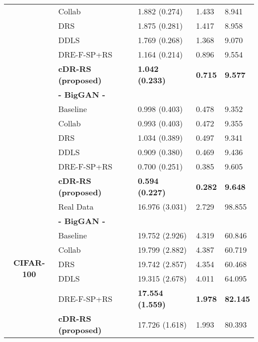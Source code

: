 \documentclass[final,12pt, 3p,times]{elsarticle}
\begin{document}
\begin{table}[htbp]
\begin{adjustbox}{width=0.5\textwidth}
\begin{tabular}{rllll}
			\multicolumn{1}{c}{} & Collab \cite{liu2020collaborative} & 1.882 (0.274) & 1.433 & 8.941 \\
			\multicolumn{1}{c}{} & DRS \cite{azadi2018discriminator}  & 1.875 (0.281) & 1.417 & 8.958\\
			\multicolumn{1}{c}{} & DDLS \cite{che2020your}  & 1.769 (0.268) & 1.368 & 9.070 \\
			\multicolumn{1}{c}{} & DRE-F-SP+RS \cite{ding2020subsampling} & 1.164 (0.214) & 0.896 & 9.554 \\
			\multicolumn{1}{c}{} & \textbf{cDR-RS (proposed)} & \textbf{1.042 (0.233)} & \textbf{0.715} & \textbf{9.577} \\
			\cline{2-5}
			\multicolumn{1}{c}{} & \textbf{- BigGAN -} &       &       &  \\
			\multicolumn{1}{c}{} & Baseline & 0.998 (0.403) & 0.478 & 9.352 \\
			\multicolumn{1}{c}{} & Collab \cite{liu2020collaborative} & 0.993 (0.403) & 0.472 & 9.355 \\
			\multicolumn{1}{c}{} & DRS \cite{azadi2018discriminator}  & 1.034 (0.389) & 0.497 & 9.341 \\
			\multicolumn{1}{c}{} & DDLS \cite{che2020your} & 0.909 (0.380) & 0.469 & 9.436 \\
			\multicolumn{1}{c}{} & DRE-F-SP+RS \cite{ding2020subsampling} & 0.700 (0.251) & 0.385 & 9.605 \\
			\multicolumn{1}{c}{} & \textbf{cDR-RS (proposed)} & \textbf{0.594 (0.227)} & \textbf{0.282} & \textbf{9.648} \\
			
			\midrule
			
			\multicolumn{1}{c}{\multirow{9}[0]{*}{\begin{sideways}\textbf{CIFAR-100}\end{sideways}}} & Real Data & 16.976 (3.031) & 2.729 & 98.855 \\
			\cline{2-5}
			\multicolumn{1}{c}{} & \textbf{- BigGAN -} &       &       &  \\
			\multicolumn{1}{c}{} & Baseline & 19.752 (2.926) & 4.319 & 60.846 \\
			\multicolumn{1}{c}{} & Collab \cite{liu2020collaborative} & 19.799 (2.882) & 4.387 & 60.719 \\
			\multicolumn{1}{c}{} & DRS \cite{azadi2018discriminator}  & 19.742 (2.857) & 4.354 & 60.468 \\
			\multicolumn{1}{c}{} & DDLS \cite{che2020your} & 19.315 (2.678) & 4.011 & 64.095 \\
			\multicolumn{1}{c}{} & DRE-F-SP+RS \cite{ding2020subsampling} & \textbf{17.554 (1.559)} & \textbf{1.978} & \textbf{82.145} \\
			\multicolumn{1}{c}{} & \textbf{cDR-RS (proposed)} & 17.726 (1.618) & 1.993 & 80.393 \\
			

\end{tabular}
\end{adjustbox}
\end{table}
\end{document}
